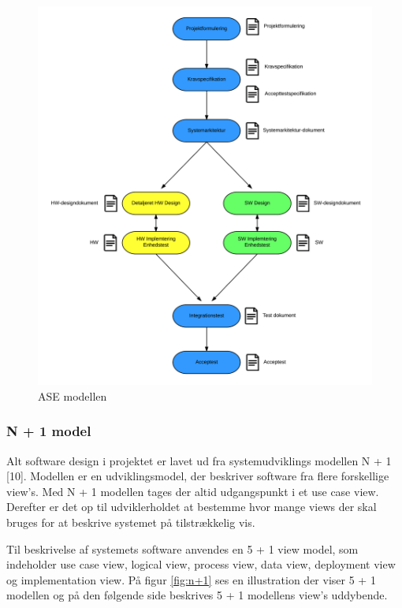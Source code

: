 \begin{figure}[H]
	\centering
	\includegraphics[width=1\textwidth]{Billeder/Udviklingsproces/ase_model}
	\caption{ASE modellen}
	\label{fig:dokument_udvikling}
\end{figure}

\newpage

\subsubsection*{N + 1 model}
Alt software design i projektet er lavet ud fra systemudviklings modellen N + 1 [10]. Modellen er en udviklingsmodel, der beskriver software fra flere forskellige view's.  
Med N + 1 modellen tages der altid udgangspunkt i et use case view. Derefter er det op til udviklerholdet at bestemme hvor mange views der skal bruges for at beskrive systemet på tilstrækkelig vis. 

Til beskrivelse af systemets software anvendes en 5 + 1 view model, som indeholder use case view, logical view, process view, data view, deployment view og implementation view. 
På figur \ref{fig:n+1} ses en illustration der viser 5 + 1 modellen og på den følgende side beskrives 5 + 1 modellens view's uddybende. 

